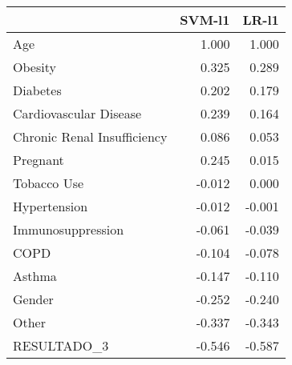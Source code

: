 \begin{tabular}{lrr}
\toprule
{} &  SVM-l1 &  LR-l1 \\
\midrule
Age                         &   1.000 &  1.000 \\
Obesity                     &   0.325 &  0.289 \\
Diabetes                    &   0.202 &  0.179 \\
Cardiovascular Disease      &   0.239 &  0.164 \\
Chronic Renal Insufficiency &   0.086 &  0.053 \\
Pregnant                    &   0.245 &  0.015 \\
Tobacco Use                 &  -0.012 &  0.000 \\
Hypertension                &  -0.012 & -0.001 \\
Immunosuppression           &  -0.061 & -0.039 \\
COPD                        &  -0.104 & -0.078 \\
Asthma                      &  -0.147 & -0.110 \\
Gender                      &  -0.252 & -0.240 \\
Other                       &  -0.337 & -0.343 \\
RESULTADO\_3                 &  -0.546 & -0.587 \\
\bottomrule
\end{tabular}
